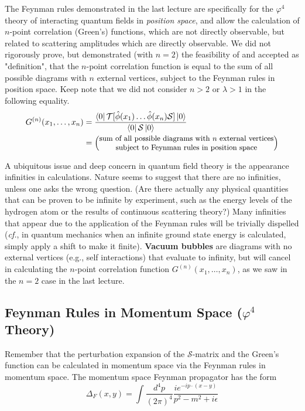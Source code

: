 \noindent The Feynman rules demonstrated in the last lecture are specifically for the $\varphi^4$ theory of interacting quantum fields in \textit{position space}, and allow the calculation of $n$-point correlation (Green's) functions, which are not directly observable, but related to scattering amplitudes which are directly observable. We did not rigorously prove, but demonstrated (with $n=2$) the feasibility of and accepted as "definition", that the $n$-point correlation function is equal to the sum of all possible diagrams with $n$ external vertices, subject to the Feynman rules in position space. Keep note that we did not consider $n>2$ or $\lambda>1$ in the following equality.
\begin{align}
G^{(n)}(x_1,\dots,x_n) &= \frac{\bra{0}\mathcal{T}[\hat{\phi}(x_1) \dots \hat{\phi}(x_n)\mathcal{S}]\ket{0}}{\bra{0}\mathcal{S}\ket{0}} \\
&= \left(\text{\small {\stackanchor{sum of all possible diagrams with $n$ external vertices}{subject to Feynman rules in position space}}}\right)
\end{align}

\noindent A ubiquitous issue and deep concern in quantum field theory is the appearance infinities in calculations. Nature seems to suggest that there are no infinities, unless one asks the wrong question. (Are there actually any physical quantities that can be proven to be infinite by experiment, such as the energy levels of the hydrogen atom or the results of continuous scattering theory?) Many infinities that appear due to the application of the Feynman rules will be trivially dispelled (\textit{cf.}, in quantum mechanics when an infinite ground state energy is calculated, simply apply a shift to make it finite). \textbf{Vacuum bubbles} are diagrams with no external vertices (e.g., self interactions) that evaluate to infinity, but will cancel in calculating the $n$-point correlation function $G^{(n)}(x_1,\dots,x_n)$, as we saw in the $n=2$ case in the last lecture.\\

\subsection*{Feynman Rules in Momentum Space ($\varphi^4$ Theory)}

\noindent Remember that the perturbation expansion of the $\mathcal{S}$-matrix and the Green's function can be calculated in momentum space via the Feynman rules in momentum space. The momentum space Feynman propagator has the form
\begin{equation}
\Delta_F(x,y) = \int \frac{d^4 p}{(2\pi)^4} \frac{i e^{-i p \cdot (x-y)}}{p^2-m^2 + i\epsilon}
\end{equation}

